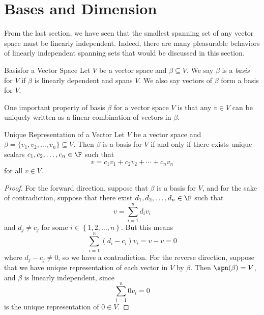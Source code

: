 \documentclass[linearalgebra]{subfiles}
\begin{document}
    \section{Bases and Dimension}

    \begin{remark}
        From the last section, we have seen that the smallest spanning set of any vector space must be linearly independent. Indeed, there are many pleasurable behaviors of linearly independent spanning sets that would be discussed in this section. 
    \end{remark}

    \begin{definition}{Basis}{for a Vector Space}
        Let $V$ be a vector space and $\beta\subseteq V$. We say $\beta$ is a \emph{basis} for $V$ if $\beta$ is linearly dependent and spans $V$. We also say vectors of $\beta$ form a basis for $V$.
    \end{definition}

    \begin{remark}
        One important property of basis $\beta$ for a vector space $V$ is that any $v\in V$ can be uniquely written as a linear combination of vectors in $\beta$.
    \end{remark}

    \begin{prop}{Unique Representation of a Vector}
        Let $V$ be a vector space and $\beta = \lbrace v_1, v_2, \ldots, v_n \rbrace\subseteq V$. Then $\beta$ is a basis for $V$ if and only if there exists unique scalars $c_1, c_2, \ldots, c_n\in \F$ such that
        \begin{equation*}
            v = c_1v_1 + c_2v_2 + \cdots + c_nv_n
        \end{equation*}
        for all $v\in V$.
    \end{prop}

    \begin{proof}
        For the forward direction, suppose that $\beta$ is a basis for $V$, and for the sake of contradiction, suppose that there exist $d_1,d_2,\ldots,d_n\in\F$ such that
        \begin{equation*}
            v = \sum^{n}_{i=1} d_iv_i
        \end{equation*}
        and $d_j\neq c_j$ for some $i\in\left\lbrace 1,2,\ldots,n \right\rbrace$. But this means 
        \begin{equation*}
            \sum^{n}_{i=1} \left( d_i-c_i \right) v_i = v - v = 0
        \end{equation*}
        where $d_j-c_j\neq 0$, so we have a contradiction. For the reverse direction, suppose that we have unique representation of each vector in $V$ by $\beta$. Then $\spn(\beta)=V$, and $\beta$ is linearly independent, since
        \begin{equation*}
            \sum^{n}_{i=1} 0v_i = 0
        \end{equation*}
        is the unique representation of $0\in V$.
    \end{proof}
\end{document}
